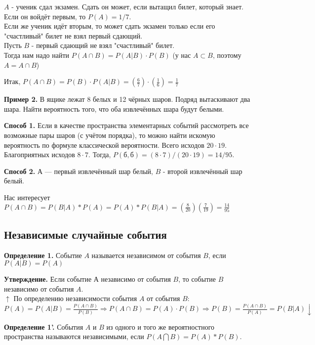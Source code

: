 \documentclass{article}
\begin{document}
    $A$ - ученик сдал экзамен. Сдать он может, если вытащил билет, который знает.\\
    Если он войдёт первым, то \(P(A)=1/7\).\\
    Если же ученик идёт вторым, то может сдать экзамен только если его "счастливый" билет не взял первый сдающий.\\
    Пусть $B$ - первый сдающий не взял "счастливый" билет.\\
    Тогда нам надо найти \(P(A \cap B) = P(A|B) \cdot P(B)\) (у нас \(A \subset B\), поэтому \(A = A \cap B\))


    Итак, \(P(A \cap B) = P(B) \cdot P(A|B) = (\frac{6}{7}) \cdot (\frac{1}{6}) = \frac{1}{7}\)

        
    \textbf{Пример 2.} В ящике лежат 8 белых и 12 чёрных шаров. Подряд вытаскивают два шара.
    Найти вероятность того, что оба извлечённых шара будут белыми.

    \textbf{Способ 1.} 
    Если в качестве пространства элементарных событий рассмотреть все возможные пары шаров (с учётом порядка), то можно найти искомую вероятность по формуле классической вероятности.
    Всего исходов \(20 \cdot 19\). Благоприятных исходов \(8 \cdot 7\). Тогда, \(P(б,б)=(8 \cdot 7)/(20 \cdot 19)=14/95\).

    \textbf{Способ 2.}
    $А$ — первый извлечённый шар белый, $B$ - второй извлечённый шар белый. 

    Нас интересует \(P(A \cap B) = P(B|A)*P(A) = P(A)*P(B|A) = (\frac{8}{20})(\frac{7}{19}) = \frac{14}{95}\)

    \subsection{Независимые случайные события}
    \textbf{Определение 1.} Событие $A$ называется независимом от события $B$, если \\
    \(P(A|B) = P(A)\)

    \textbf{Утверждение.} Если событие $А$ независимо от события $B$, то событие $B$ независимо от события $A$.\\
    \( \uparrow \) По определению независимости события $A$ от события $B$:
    \( P(A) = P(A|B) = \frac{P(A \cap B)}{P(B)} \Rightarrow P(A \cap B) = P(A) \cdot P(B) \Rightarrow P(B) = \frac{P(A \cap B)}{P(A)} = P(B|A) \downarrow\)

    \textbf{Определение 1'.} События $A$ и $B$ из одного и того же вероятностного пространства называются независимыми, если \(P(A \bigcap B) = P(A)*P(B)\). 
\end{document}
